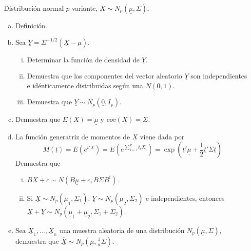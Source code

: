 \documentclass[twoside]{article}
\newcommand{\media}[1]{{\overline{#1}}}
\newcommand{\muestra}[1]{{\underline{#1}}}
\newcommand{\m}[1]{{\muestra{#1}}}
\newcommand{\mX}{{\muestra{X}}}
\begin{document}
\begin{ejercicio}{1.2}
Distribución normal $p$-variante, $\mX \sim N_p(\m{μ},Σ)$.
\begin{enumerate}[(a)]
\item Definición.
\item Sea $\m{Y} = Σ^{-1/2}(\mX - \m{μ})$.
\begin{enumerate}[i.]
  \item Determinar la función de densidad de $\m{Y}$.
  \item Demuestra que las componentes del vector aleatorio $\m{Y}$ son independientes e idénticamente distribuidas según una $N(0,1)$.
  \item Demuestra que $\m{Y} \sim N_p(\m{0},I_p)$.
\end{enumerate}
\item Demuestra que $E(\mX) = \m{μ}$ y $cov(\m{X}) = Σ$.
\item La función generatriz de momentos de $\m{X}$ viene dada por
\[ M(\m{t}) = E\left(e^{\m{t}'\mX}\right) = E\left(e^{\sum_{i=1}^p t_i X_i}\right) = \exp\left(\m{t}'\m{μ} + \frac{1}{2}\m{t}'Σ\m{t}\right)\]
Demuestra que
\begin{enumerate}[i.]
\item $B \mX + \m{c} \sim N(B \m{μ} + \m{c}, B Σ B^t)$.
\item Si $\mX \sim N_p(\m{μ}_1,Σ_1)$, $\m{Y} \sim N_p(\m{μ}_2,Σ_2)$ e independientes, entonces $\mX+\m{Y} \sim N_p(\m{μ}_1+\m{μ}_2, Σ_1+Σ_2)$.
\end{enumerate}
\item Sea $\mX_1,\dots,\mX_n$ una muestra aleatoria de una distribución $N_p(\m{μ},Σ)$, demuestra que $\media{\m{X}} \sim N_p(\m{μ}, \frac{1}{n}Σ)$.
\end{enumerate}
\end{ejercicio}
\end{document}
